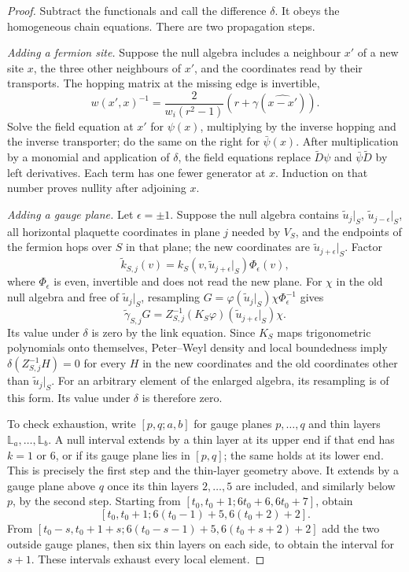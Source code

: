 \documentclass[11pt,letterpaper,reqno]{amsart}
\theoremstyle{definition}
\theoremstyle{remark}
\begin{document}
\begin{proof}
Subtract the functionals and call the difference $\delta$.
It obeys the homogeneous chain equations. There are two
propagation steps.

\emph{Adding a fermion site.} Suppose the null algebra includes
a neighbour $x'$ of a new site $x$, the three other neighbours
of $x'$, and the coordinates read by their transports.
The hopping matrix at the missing edge is invertible,
\[
 w(x',x)^{-1}=\frac2{w_i(r^2-1)}(r+\gamma(\widehat{x-x'})).
\]
Solve the field equation at $x'$ for $\psi(x)$, multiplying
by the inverse hopping and the inverse transporter; do the same
on the right for $\bar\psi(x)$. After multiplication by a
monomial and application of $\delta$, the field equations
replace $\widetilde D\psi$ and $\bar\psi\widetilde D$ by
left derivatives. Each term has one fewer generator at $x$.
Induction on that number proves nullity after adjoining $x$.

\emph{Adding a gauge plane.} Let $\epsilon=\pm1$.
Suppose the null algebra contains $\widetilde u_j|_S$,
$\widetilde u_{j-\epsilon}|_S$, all horizontal plaquette
coordinates in plane $j$ needed by $V_S$, and the endpoints
of the fermion hops over $S$ in that plane; the new coordinates
are $\widetilde u_{j+\epsilon}|_S$. Factor
\[
 \widetilde k_{S,j}(v)
       =k_S(v,\widetilde u_{j+\epsilon}|_S)\Phi_\epsilon(v),
\]
where $\Phi_\epsilon$ is even, invertible and does not read
the new plane. For $\chi$ in the old null algebra and free of
$\widetilde u_j|_S$,
resampling
$G=\varphi(\widetilde u_j|_S)\chi\Phi_\epsilon^{-1}$
gives
\[
 \widetilde\gamma_{S,j}G
       =Z_{S,j}^{-1}(K_S\varphi)
                     (\widetilde u_{j+\epsilon}|_S)\chi.
\]
Its value under $\delta$ is zero by the link equation.
Since $K_S$ maps trigonometric polynomials onto themselves,
Peter--Weyl density \cite[Theorem~37.5(ii)]{Etingof} and local boundedness imply
$\delta(Z_{S,j}^{-1}H)=0$ for every $H$ in the new coordinates
and the old coordinates other than $\widetilde u_j|_S$.
For an arbitrary element of the enlarged algebra, its resampling
is of this form. Its value under $\delta$ is therefore zero.

To check exhaustion, write $[p,q;a,b]$ for gauge planes
$p,\ldots,q$ and thin layers $\mathbb L_a,\ldots,\mathbb L_b$.
A null interval extends by a thin layer at its upper end if
that end has $k=1$ or $6$, or if its gauge plane lies in $[p,q]$;
the same holds at its lower end. This is precisely the first
step and the thin-layer geometry above. It extends by a gauge
plane above $q$ once its thin layers $2,\ldots,5$ are included,
and similarly below $p$, by the second step. Starting from
$[t_0,t_0+1;6t_0+6,6t_0+7]$, obtain
\[
 [t_0,t_0+1;6(t_0-1)+5,6(t_0+2)+2].
\]
From
$[t_0-s,t_0+1+s;6(t_0-s-1)+5,6(t_0+s+2)+2]$
add the two outside gauge planes, then six thin layers on
each side, to obtain the interval for $s+1$.
These intervals exhaust every local element.
\end{proof}
\end{document}
